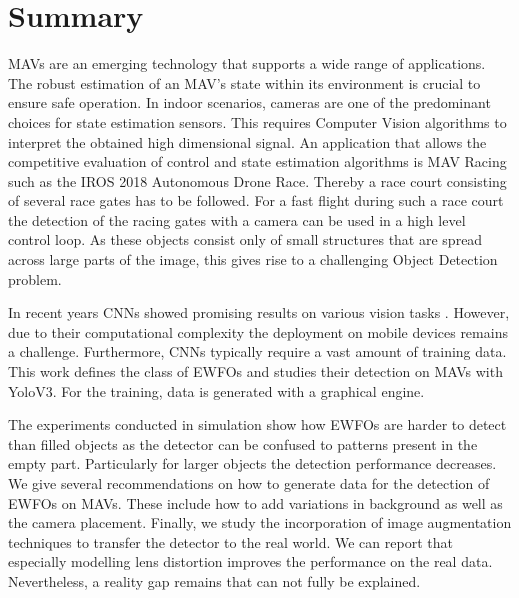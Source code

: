 \chapter*{Summary}

\ac{MAV}s are an emerging technology that supports a wide range of applications. The robust estimation of an \ac{MAV}'s state within its environment is crucial to ensure safe operation. In  indoor scenarios, cameras are one of the predominant choices for state estimation sensors. This requires Computer Vision algorithms to interpret the obtained high dimensional signal. An application that allows the competitive evaluation of control and state estimation algorithms is \ac{MAV} Racing such as the \ac{IROS} 2018 Autonomous Drone Race. Thereby a race court consisting of several race gates has to be followed. For a fast flight during such a race court the detection of the racing gates with a camera can be used in a high level control loop. As these objects consist only of small structures that are spread across large parts of the image, this gives rise to a challenging Object Detection problem.

In recent years \acp{CNN} showed promising results on various vision tasks . However, due to their computational complexity the deployment on mobile devices remains a challenge. Furthermore, \acp{CNN} typically require a vast amount of training data. This work defines the class of \acp{EWFO} and studies their detection on \acp{MAV} with \ac{Yolo}V3. For the training, data is generated with a graphical engine.  

The experiments conducted in simulation show how \acp{EWFO} are harder to detect than filled objects as the detector can be confused to patterns present in the empty part. Particularly for larger objects the detection performance decreases. We give several recommendations on how to generate data for the detection of \acp{EWFO} on \acp{MAV}. These include how to add variations in background as well as the camera placement. Finally, we study the incorporation of image augmentation techniques to transfer the detector to the real world. We can report that especially modelling lens distortion improves the performance on the real data. Nevertheless, a reality gap remains that can not fully be explained.

